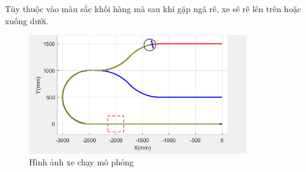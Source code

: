                \hspace*{0.6cm}Tùy thuộc vào màu sắc khối hàng mà sau khi gặp ngã rẽ, xe sẽ rẽ lên trên hoặc xuống dưới.
               \begin{figure}[H]
                    \centering
                    \includegraphics[width=0.85\textwidth]{pictures/chapter8/running.png}
                    \caption{Hình ảnh xe chạy mô phỏng}
                    \label{running}
               \end{figure}     


